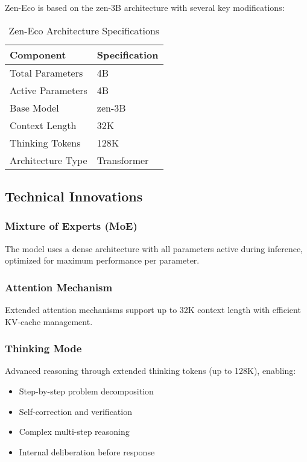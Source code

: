 \documentclass[11pt,a4paper]{article}
\begin{document}
Zen-Eco is based on the zen-3B architecture with several key modifications:

\begin{table}[H]
\centering
\begin{tabular}{ll}
\toprule
\textbf{Component} & \textbf{Specification} \\
\midrule
Total Parameters & 4B \\
Active Parameters & 4B \\
Base Model & zen-3B \\
Context Length & 32K \\
Thinking Tokens & 128K \\


Architecture Type & Transformer \\
\bottomrule
\end{tabular}
\caption{Zen-Eco Architecture Specifications}
\end{table}

\subsection{Technical Innovations}

\subsubsection{Mixture of Experts (MoE)}
The model uses a dense architecture with all parameters active during inference, optimized for maximum performance per parameter.

\subsubsection{Attention Mechanism}
Extended attention mechanisms support up to 32K context length with efficient KV-cache management.

\subsubsection{Thinking Mode}
Advanced reasoning through extended thinking tokens (up to 128K), enabling:
\begin{itemize}
    \item Step-by-step problem decomposition
    \item Self-correction and verification
    \item Complex multi-step reasoning
    \item Internal deliberation before response
\end{itemize}
\end{document}

